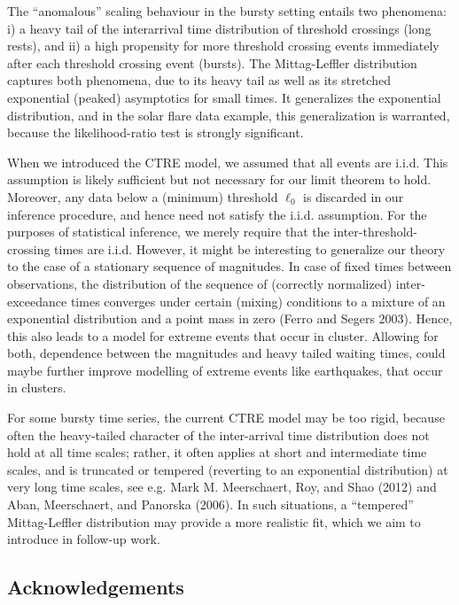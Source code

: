 \documentclass[smallextended]{svjour3}       %
\begin{document}
The ``anomalous'' scaling behaviour in the bursty setting entails two
phenomena: i) a heavy tail of the interarrival time distribution of
threshold crossings (long rests), and ii) a high propensity for more
threshold crossing events immediately after each threshold crossing
event (bursts). The Mittag-Leffler distribution captures both phenomena,
due to its heavy tail as well as its stretched exponential (peaked)
asymptotics for small times. It generalizes the exponential
distribution, and in the solar flare data example, this generalization
is warranted, because the likelihood-ratio test is strongly significant.

When we introduced the CTRE model, we assumed that all events are i.i.d.
This assumption is likely sufficient but not necessary for our limit
theorem to hold. Moreover, any data below a (minimum) threshold
\(\ell_0\) is discarded in our inference procedure, and hence need not
satisfy the i.i.d. assumption. For the purposes of statistical
inference, we merely require that the inter-threshold-crossing times are
i.i.d. However, it might be interesting to generalize our theory to the
case of a stationary sequence of magnitudes. In case of fixed times
between observations, the distribution of the sequence of (correctly
normalized) inter-exceedance times converges under certain (mixing)
conditions to a mixture of an exponential distribution and a point mass
in zero (Ferro and Segers 2003). Hence, this also leads to a model for
extreme events that occur in cluster. Allowing for both, dependence
between the magnitudes and heavy tailed waiting times, could maybe
further improve modelling of extreme events like earthquakes, that occur
in clusters.

For some bursty time series, the current CTRE model may be too rigid,
because often the heavy-tailed character of the inter-arrival time
distribution does not hold at all time scales; rather, it often applies
at short and intermediate time scales, and is truncated or tempered
(reverting to an exponential distribution) at very long time scales, see
e.g. Mark M. Meerschaert, Roy, and Shao (2012) and Aban, Meerschaert,
and Panorska (2006). In such situations, a ``tempered'' Mittag-Leffler
distribution may provide a more realistic fit, which we aim to introduce
in follow-up work.

\subsection*{Acknowledgements}\label{acknowledgements}
\end{document}
